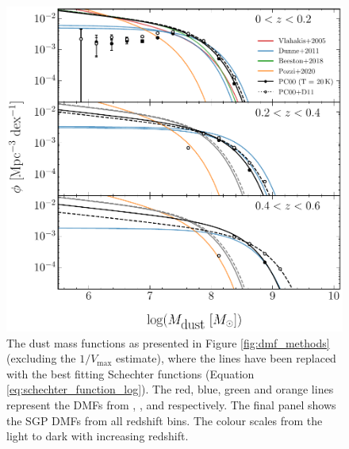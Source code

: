 \begin{figure}
	\centering
	\includegraphics[width=\columnwidth]{Figures/dmf_schechter_part1.pdf}
    \caption[Schechter functions derived from the SGP DMFs alongside relevant studies]{The dust mass functions as presented in Figure \ref{fig:dmf_methods} (excluding the $1/V_{\textrm{max}}$ estimate), where the lines have been replaced with the best fitting Schechter functions (Equation \ref{eq:schechter_function_log}). The red, blue, green and orange lines represent the DMFs from \citealt{Vlahakis_2005}, \citealt{Dunne_2011}, \citealt{Beeston_2018} and \citealt{Pozzi_2020} respectively. The final panel shows the SGP DMFs from all redshift bins. The colour scales from the light to dark with increasing redshift.}
	\label{fig:dmf_schechter}
\end{figure}

